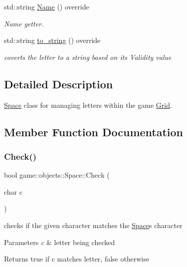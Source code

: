 \begin{DoxyCompactItemize}
std\+::string \hyperlink{classgame_1_1objects_1_1Space_a3df31a4e4a23a99baa7363df9a518705}{Name} () override
\begin{DoxyCompactList}\small\item\em Name getter. \end{DoxyCompactList}\item 
std\+::string \hyperlink{classgame_1_1objects_1_1Space_a1498390be3206f8c9e4e8f77bb939c31}{to\+\_\+string} () override
\begin{DoxyCompactList}\small\item\em coverts the letter to a string based on its Validity value \end{DoxyCompactList}\end{DoxyCompactItemize}


\subsection{Detailed Description}
\hyperlink{classgame_1_1objects_1_1Space}{Space} class for managing letters within the game \hyperlink{classgame_1_1objects_1_1Grid}{Grid}. 

\subsection{Member Function Documentation}
\mbox{\label{classgame_1_1objects_1_1Space_a3fe6ab73a208e58462a5883b398bc994}} 
\subsubsection{\texorpdfstring{Check()}{Check()}}
{\footnotesize\ttfamily bool game\+::objects\+::\+Space\+::\+Check (\begin{DoxyParamCaption}\item[{char}]{c }\end{DoxyParamCaption})}



checks if the given character matches the \hyperlink{classgame_1_1objects_1_1Space}{Space}\textquotesingle{}s character 


\begin{DoxyParams}{Parameters}
{\em c} & letter being checked \\
\hline
\end{DoxyParams}
\begin{DoxyReturn}{Returns}
true if c matches letter, false otherwise 
\end{DoxyReturn}
\mbox{\label{classgame_1_1objects_1_1Space_a4d4114b0deca499cfe9ef6b5e3bdddc6}} 
